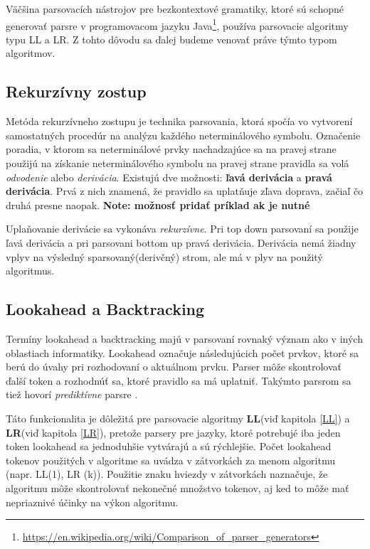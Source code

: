 Väčšina parsovacích nástrojov pre bezkontextové gramatiky, ktoré sú schopné generovať parsre v programovacom jazyku Java\footnote{\url{https://en.wikipedia.org/wiki/Comparison_of_parser_generators}}, používa parsovacie algoritmy typu LL a LR. Z tohto dôvodu sa ďalej budeme venovať práve týmto typom algoritmov.

\subsection{Rekurzívny zostup}\label{recursive-descent}
Metóda rekurzívneho zostupu je technika parsovania, ktorá spočía vo vytvorení samostatných procedúr na analýzu každého neterminálového symbolu. \cite{CVUT:program_language} Označenie poradia, v ktorom sa neterminálové prvky nachadzajúce sa na pravej strane použijú na získanie neterminálového symbolu na pravej strane pravidla sa volá \textit{odvodenie} alebo \textit{derivácia}. Existujú dve možnosti: \textbf{ľavá derivácia} a \textbf{pravá derivácia}. Prvá z nich znamená, že pravidlo sa uplatňuje zľava doprava, začiaľ čo druhá presne naopak. 
\textbf{Note: možnosť pridať príklad ak je nutné}

Uplaňovanie derivácie sa vykonáva \textit{rekurzívne}. Pri top down parsovaní sa použije ľavá derivácia a pri parsovani bottom up pravá derivácia. Derivácia nemá žiadny vplyv na výsledný sparsovaný(derivčný) strom, ale má v plyv na použitý algoritmus.

\subsection{Lookahead a Backtracking}
Termíny lookahead a backtracking majú v parsovaní rovnaký význam ako v iných oblastiach informatiky. Lookahead označuje následujúcich počet prvkov, ktoré sa berú do úvahy pri rozhodovaní o aktuálnom prvku. Parser môže skontrolovať ďalší token a rozhodnúť sa, ktoré pravidlo sa má uplatniť. Takýmto parsrom sa tiež hovorí \textit{prediktívne} parsre \cite{haberman:parsing_demystified}.

Táto funkcionalita je dôležitá pre parsovacie algoritmy \textbf{LL}(viď kapitola \ref{LL}) a \textbf{LR}(viď kapitola \ref{LR}), pretože parsery pre jazyky, ktoré potrebujé iba jeden token lookahead sa jednoduhšie vytvárajú a sú rýchlejšie. Počet lookahead tokenov použitých v algoritme sa uvádza v zátvorkách za menom algoritmu (napr. LL(1), LR (k)). Použitie znaku hviezdy v zátvorkách naznačuje, že algoritmu môže skontrolovať nekonečné množstvo tokenov, aj ked to môže mať nepriaznivé účinky na výkon algoritmu.\cite{tomassetti:parsing}

